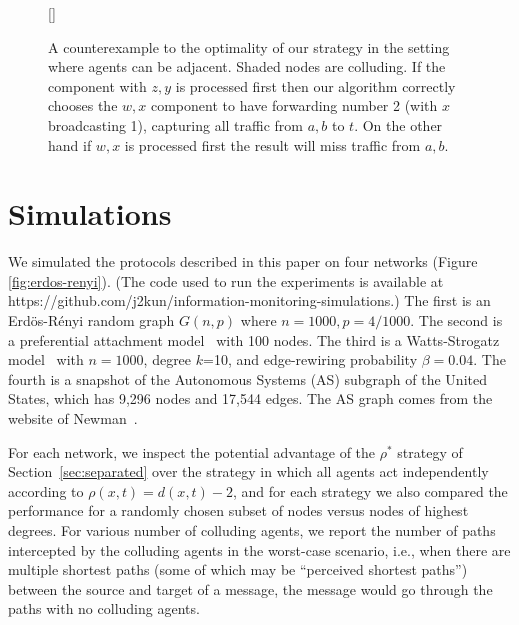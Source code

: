 \documentclass{comnet}
\begin{document}
\begin{figure}[h]
[\FBwidth]
{\caption{A counterexample to the optimality of our strategy in the setting
where agents can be adjacent. Shaded nodes are colluding. If the component with
$z,y$ is processed first then our algorithm correctly chooses the $w,x$
component to have forwarding number 2 (with $x$ broadcasting 1), capturing all
traffic from $a,b$ to $t$.  On the other hand if $w,x$ is processed first the
result will miss traffic from $a,b$.} \label{fig:forwarding-ctex}}
{} \end{figure}


\section{Simulations} \label{sec:simulations}
 
We simulated the protocols described in this paper on four networks (Figure
\ref{fig:erdos-renyi}). (The code used to run the experiments is available at
https://github.com/j2kun/information-monitoring-simulations.) The first is an
Erd\"os-R\'enyi random graph $G(n, p)$ where $n = 1000, p = 4/1000$. The second
is a preferential attachment model~\cite{BarabasiA99} with 100 nodes. The third
is a Watts-Strogatz model~\cite{WattsS98} with $n=1000$, degree $k$=10, and
edge-rewiring probability $\beta=0.04$. The fourth is a snapshot of the
Autonomous Systems (AS) subgraph of the United States, which has 9,296 nodes
and 17,544 edges. The AS graph comes from the website of
Newman~\cite{Newman06}. 

For each network, we inspect the potential advantage of the $\rho^*$ strategy
of Section~\ref{sec:separated} over the strategy in which all agents act
independently according to $\rho(x,t) = d(x,t) - 2$, and for each strategy we
also compared the performance for a randomly chosen subset of nodes versus
nodes of highest degrees. For various number of colluding agents, we report the
number of paths intercepted by the colluding agents in the worst-case scenario,
i.e., when there are multiple  shortest paths (some of which may be ``perceived
shortest paths'') between the source and target of a message, the message would
go through the paths with no colluding agents.
\end{document}
